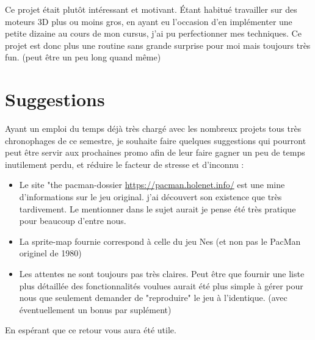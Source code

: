 \documentclass [twoside,a4paper,11pt,french] {report}
\begin{document}
    Ce projet était plutôt intéressant et motivant. Étant habitué travailler sur des moteurs 3D plus ou moins gros, en ayant eu l'occasion d'en
    implémenter une petite dizaine au cours de mon cursus, j'ai pu perfectionner mes techniques.
    Ce projet est donc plus une routine sans grande surprise pour moi mais toujours très fun. 
    (peut être un peu long quand même)

\section{Suggestions}

    Ayant un emploi du temps déjà très chargé avec les nombreux projets tous très chronophages de ce semestre,
    je souhaite faire quelques suggestions qui pourront peut être servir aux prochaines promo afin de leur faire gagner
    un peu de temps inutilement perdu, et réduire le facteur de stresse et d'inconnu :
    
    \begin{itemize}
        \item Le site "the pacman-dossier \url{https://pacman.holenet.info/} est une mine d'informations sur le jeu original.
        j'ai découvert son existence que très tardivement. Le mentionner dans le sujet aurait je pense été très pratique
        pour beaucoup d'entre nous.
        \item La sprite-map fournie correspond à celle du jeu Nes (et non pas le PacMan originel de 1980)
        \item Les attentes ne sont toujours pas très claires.
        Peut être que fournir une liste plus détaillée des fonctionnalités voulues aurait été plus simple à gérer pour nous
        que seulement demander de "reproduire" le jeu à l'identique. (avec éventuellement un bonus par suplément)
    \end{itemize}
    En espérant que ce retour vous aura été utile.
\end{document}
